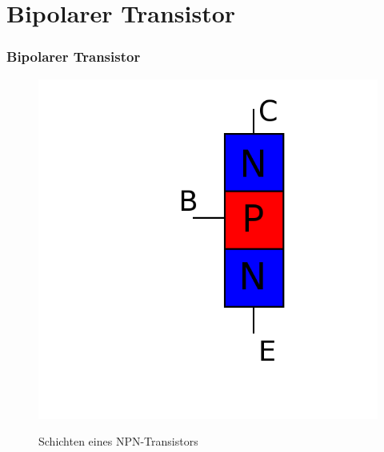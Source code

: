 \section*{Bipolarer Transistor}
\begin{frame}
  \frametitle{Bipolarer Transistor}
  \begin{minipage}{0.4\textwidth}
    \begin{figure}
      \includegraphics[width=\textwidth,height=.4\textheight,keepaspectratio]{e13/NPN_hlb.png}\\
      \caption{Schichten eines \hbox{NPN-Transistors}}
    \end{figure}
  \end{minipage}
  \hspace{0.5cm}
  \begin{minipage}{0.4\textwidth}
    \begin{figure}

\end{figure}
\end{minipage}
\end{frame}
